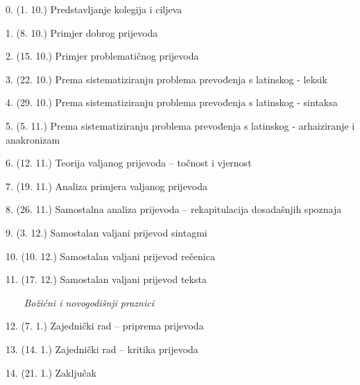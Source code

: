 \documentclass[12pt]{article}
\begin{document}
\begin{center} \begin{minipage}{5.5in}
\begin{flushleft}

\hspace*{-0.5in} 0. (1. 10.) Predstavljanje kolegija i ciljeva

\hspace*{-0.5in} 1. (8. 10.) Primjer dobrog prijevoda

\hspace*{-0.5in} 2. (15. 10.) Primjer problematičnog prijevoda

\hspace*{-0.5in} 3. (22. 10.) Prema sistematiziranju problema prevođenja s latinskog - leksik

\hspace*{-0.5in} 4. (29. 10.) Prema sistematiziranju problema prevođenja s latinskog - sintaksa

\hspace*{-0.5in} 5. (5. 11.) Prema sistematiziranju problema prevođenja s latinskog - arhaiziranje i anakronizam

\hspace*{-0.5in} 6. (12. 11.) Teorija valjanog prijevoda – točnost i vjernost

\hspace*{-0.5in} 7. (19. 11.) Analiza primjera valjanog prijevoda

\hspace*{-0.5in} 8. (26. 11.) Samostalna analiza prijevoda – rekapitulacija dosadašnjih spoznaja

\hspace*{-0.5in}  9. (3. 12.) Samostalan valjani prijevod sintagmi

\hspace*{-0.5in}  10. (10. 12.) Samostalan valjani prijevod rečenica

\hspace*{-0.5in}  11. (17. 12.) Samostalan valjani prijevod teksta

\medskip

\hspace*{-0.5in}  \textit{~~~ Božićni i novogodišnji praznici}

\medskip

\hspace*{-0.5in}  12. (7. 1.) Zajednički rad – priprema prijevoda

\hspace*{-0.5in}  13. (14. 1.) Zajednički rad – kritika prijevoda

\hspace*{-0.5in}  14. (21. 1.) Zaključak


\end{flushleft}
\end{minipage}
\end{center}
\end{document}
